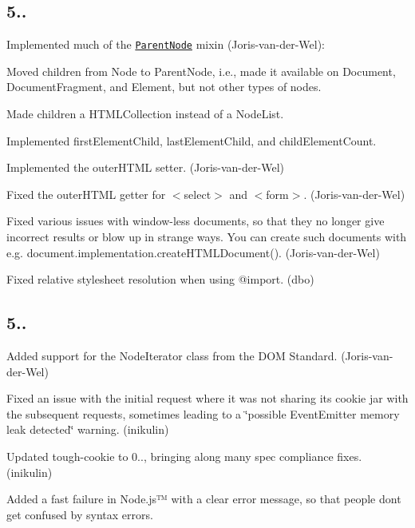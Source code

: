 \subsection*{5..}


\begin{DoxyItemize}
\item Implemented much of the \href{https://dom.spec.whatwg.org/#interface-parentnode}{\tt {\ttfamily Parent\+Node}} mixin (Joris-\/van-\/der-\/\+Wel)\+:
\begin{DoxyItemize}
\item Moved {\ttfamily children} from {\ttfamily Node} to {\ttfamily Parent\+Node}, i.\+e., made it available on {\ttfamily Document}, {\ttfamily Document\+Fragment}, and {\ttfamily Element}, but not other types of nodes.
\item Made {\ttfamily children} a {\ttfamily H\+T\+M\+L\+Collection} instead of a {\ttfamily Node\+List}.
\item Implemented {\ttfamily first\+Element\+Child}, {\ttfamily last\+Element\+Child}, and {\ttfamily child\+Element\+Count}.
\end{DoxyItemize}
\item Implemented the {\ttfamily outer\+H\+T\+ML} setter. (Joris-\/van-\/der-\/\+Wel)
\item Fixed the {\ttfamily outer\+H\+T\+ML} getter for {\ttfamily $<$select$>$} and {\ttfamily $<$form$>$}. (Joris-\/van-\/der-\/\+Wel)
\item Fixed various issues with window-\/less documents, so that they no longer give incorrect results or blow up in strange ways. You can create such documents with e.\+g. {\ttfamily document.\+implementation.\+create\+H\+T\+M\+L\+Document()}. (Joris-\/van-\/der-\/\+Wel)
\item Fixed relative stylesheet resolution when using {\ttfamily @import}. (dbo)
\end{DoxyItemize}

\subsection*{5..}


\begin{DoxyItemize}
\item Added support for the {\ttfamily Node\+Iterator} class from the D\+OM Standard. (Joris-\/van-\/der-\/\+Wel)
\item Fixed an issue with the initial request where it was not sharing its cookie jar with the subsequent requests, sometimes leading to a \char`\"{}possible Event\+Emitter memory leak detected\char`\"{} warning. (inikulin)
\item Updated tough-\/cookie to 0.., bringing along many spec compliance fixes. (inikulin)
\item Added a fast failure in Node.\+js™ with a clear error message, so that people don\textquotesingle{}t get confused by syntax errors.
\end{DoxyItemize}

